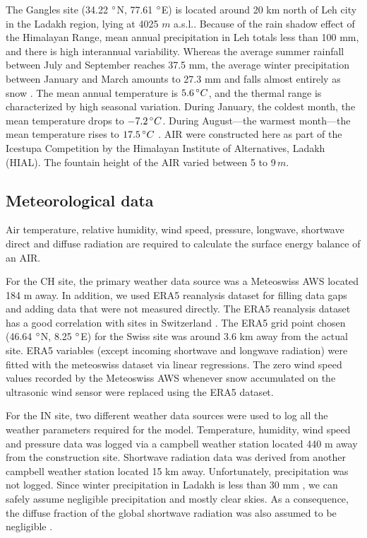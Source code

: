\documentclass[utf8]{frontiersSCNS}
\begin{document}
The Gangles site (34.22 $\degree$N, 77.61 $\degree$E) is located around 20 km north of Leh city in the Ladakh
region, lying at 4025 $m$ a.s.l.. Because of the rain shadow effect of the Himalayan Range, mean annual
precipitation in Leh totals less than 100 mm, and there is high interannual variability. Whereas the average
summer rainfall between July and September reaches 37.5 mm, the average winter precipitation between January and
March amounts to 27.3 mm and falls almost entirely as snow . The mean annual temperature is $5.6 \, \degree C$,
and the thermal range is characterized by high seasonal variation. During January, the coldest month, the mean
temperature drops to $-7.2 \, \degree C$. During August—the warmest month—the mean temperature rises to $17.5 \,
	\degree C$ \citep{Nusser_2012}. AIR were constructed here as part of the Icestupa Competition  by the Himalayan
Institute of Alternatives, Ladakh (HIAL). The fountain height of the AIR varied between 5 to 9\,$m$.

\subsection{Meteorological data}

Air temperature, relative humidity, wind speed, pressure, longwave, shortwave direct and diffuse radiation are
required to calculate the surface energy balance of an AIR.

For the CH site, the primary weather data source was a Meteoswiss AWS located 184 m away. In addition, we used
ERA5 reanalysis dataset \citep{era5} for filling data gaps and adding data that were not measured directly.  The
ERA5 reanalysis dataset has a good correlation with sites in Switzerland \citep{Scherrer_2020}. The ERA5 grid
point chosen (46.64 $\degree$N, 8.25 $\degree$E) for the Swiss site was around 3.6 km away from the actual site.
ERA5 variables (except incoming shortwave and longwave radiation) were fitted with the meteoswiss dataset via
linear regressions. The zero wind speed values recorded by the Meteoswiss AWS whenever snow accumulated on the
ultrasonic wind sensor were replaced using the ERA5 dataset.

For the IN site, two different weather data sources were used to log all the weather parameters required for the
model. Temperature, humidity, wind speed and pressure data was logged via a campbell weather station located 440
m away from the construction site. Shortwave radiation data was derived from another campbell weather station
located 15 km away. Unfortunately, precipitation was not logged. Since winter precipitation in Ladakh is less
than 30 mm \citep{Nusser_2012}, we can safely assume negligible precipitation and mostly clear skies. As a
consequence, the diffuse fraction of the global shortwave radiation was also assumed to be negligible .
\end{document}

